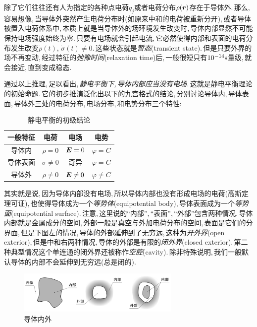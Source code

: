 除了它们往往还有人为指定的各种点电荷$q_j$或者电荷分布$\rho(\boldsymbol{r})$存在于导体外.\,那么,\,容易想像,\,当导体外突然产生电荷分布时(如原来中和的电荷被重新分开),\,或者导体被置入电荷体系中,\,本质上就是当导体外的场环境发生改变时,\,导体内部显然不可能保持电场强度始终为零.\,只要有电场就会引起电流,\,它必然使得内部和表面的电荷分布发生改变$\dot{\rho}(t),\,\dot{\sigma}(t)\neq 0$.\,这些状态就是\emph{暂态}(transient state).\,但是只要外界的场不再变动,\,经过特征的\emph{弛豫时间}(relaxation time)后,\,一般很短只有$10^{-14}{\rm s}$量级,\,就会接近,\,直到变成稳态.

通过以上推理,\,足以看出,\,\emph{静电平衡下,\,导体内部应当没有电场.}\,这就是静电平衡理论的初始命题.\,它的初步推演泛化出以下的九宫格式的结论,\,分别讨论导体内,\,导体表面,\,导体外三处的电荷分布,\,电场分布,\,和电势分布三个特性:

\begin{table}[H]
\centering
\begin{tabular}{|c||c|c|c|}
\hline
一般特征	&电荷		  		&电场&电势\\
\hline\hline
导体内 		&$\rho = 0$			&$\boldsymbol{E} = 0$	&$\varphi=C$\\
\hline
导体表面	&$\sigma\neq 0$ 	&奇异			&$\varphi=C$\\
\hline
导体外 		&$\rho \neq 0$ 	&$\boldsymbol{E} \neq 0$&$\varphi\neq C$\\
\hline
\end{tabular}
\caption{静电平衡的初级结论}
\end{table}

其实就是说,\,因为导体内部没有电场,\,所以导体内部也没有形成电场的电荷(高斯定理可证),\,也使得导体成为一个\emph{等势体}(equipotential body),\,导体表面成为一个\emph{等势面}(equipotential surface).\,注意,\,这里说的``内部'',\,``表面'',\,``外部''包含两种情况.\,导体内部就是金属成分的空间,\,外部一般是真空与外加电荷分布的空间,\,表面是它们的分界面,\,但是下图左的情况,\,导体的外部延伸到了无穷远,\,这种为\emph{开外界}(open exterior),\,但是中和右两种情况,\,导体的外部是有限的\emph{闭外界}(closed exterior).\,第二种典型情况这个单连通的闭外界还被称作\emph{空腔}(cavity).\,除非特殊说明,\,我们一般默认导体的内部不会延伸到无穷远(总是闭的).

\begin{figure}[H]
\centering
\includegraphics[width=0.7\textwidth]{image/7-2-2.png}
\caption{导体内外}
\end{figure}

